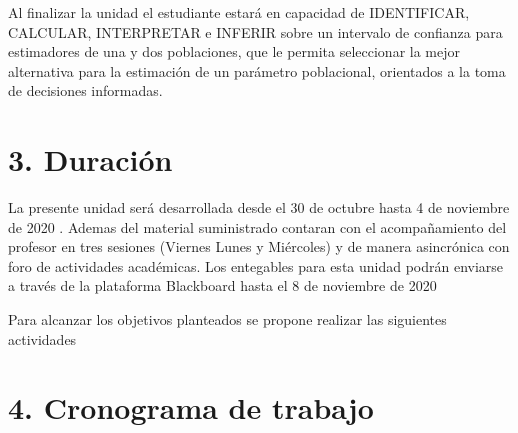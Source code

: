 \documentclass[base=hide,11pt]{elegantbook}
\begin{document}
Al finalizar la unidad el estudiante estará en capacidad de IDENTIFICAR, CALCULAR, INTERPRETAR e INFERIR sobre un intervalo de confianza para estimadores de una y dos poblaciones,
que le permita seleccionar la mejor alternativa para la estimación de un parámetro poblacional, orientados a la toma de decisiones  informadas.


\section*{3. Duración}
La presente  unidad será desarrollada desde el 30 de octubre hasta 4 de noviembre de 2020 . Ademas del material suministrado  contaran con el acompañamiento del profesor en tres sesiones (Viernes Lunes y  Miércoles) y de manera asincrónica con  foro de actividades académicas. Los entegables para esta unidad podrán enviarse a través de la plataforma Blackboard hasta el  8 de noviembre de 2020 

Para alcanzar los objetivos planteados se propone realizar las siguientes actividades
% 	
\section*{4. Cronograma de trabajo}
\end{document}
